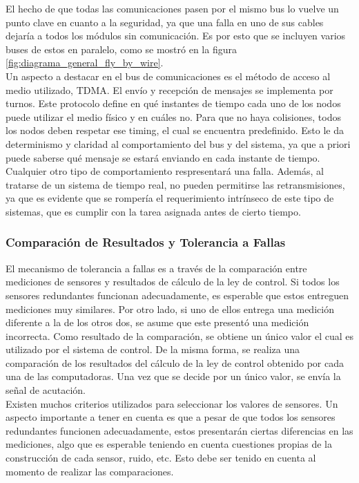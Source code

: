 El hecho de que todas las comunicaciones pasen por el mismo bus lo vuelve un punto clave en cuanto a la seguridad, ya que una falla en uno de sus cables dejaría a todos los módulos sin comunicación. Es por esto que se incluyen varios buses de estos en paralelo, como se mostró en la figura \ref{fig:diagrama_general_fly_by_wire}.\\

Un aspecto a destacar en el bus de comunicaciones es el método de acceso al medio utilizado, TDMA. El envío y recepción de mensajes se implementa por turnos. Este protocolo define en qué instantes de tiempo cada uno de los nodos puede utilizar el medio físico y en cuáles no. Para que no haya colisiones, todos los nodos deben respetar ese timing, el cual se encuentra predefinido. Esto le da determinismo y claridad al comportamiento del bus y del sistema, ya que a priori puede saberse qué mensaje se estará enviando en cada instante de tiempo. Cualquier otro tipo de comportamiento respresentará una falla. Además, al tratarse de un sistema de tiempo real, no pueden permitirse las retransmisiones, ya que es evidente que se rompería el requerimiento intrínseco de este tipo de sistemas, que es cumplir con la tarea asignada antes de cierto tiempo.

\subsubsection{Comparación de Resultados y Tolerancia a Fallas}

El mecanismo de tolerancia a fallas es a través de la comparación entre mediciones de sensores y resultados de cálculo de la ley de control. Si todos los sensores redundantes funcionan adecuadamente, es esperable que estos entreguen mediciones muy similares. Por otro lado, si uno de ellos entrega una medición diferente a la de los otros dos, se asume que este presentó una medición incorrecta. Como resultado de la comparación, se obtiene un único valor el cual es utilizado por el sistema de control. De la misma forma, se realiza una comparación de los resultados del cálculo de la ley de control obtenido por cada una de las computadoras. Una vez que se decide por un único valor, se envía la señal de acutación.\\

Existen muchos criterios utilizados para seleccionar los valores de sensores. Un aspecto importante a tener en cuenta es que a pesar de que todos los sensores redundantes funcionen adecuadamente, estos presentarán ciertas diferencias en las mediciones, algo que es esperable teniendo en cuenta cuestiones propias de la construcción de cada sensor, ruido, etc. Esto debe ser tenido en cuenta al momento de realizar las comparaciones.\\

